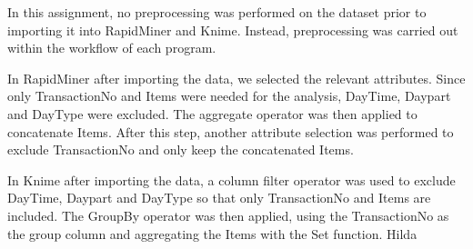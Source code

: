 \label{chap:data-preprocessing}
In this assignment, no preprocessing was performed on the dataset prior to importing it into RapidMiner and Knime. 
Instead, preprocessing was carried out within the workflow of each program. 

In RapidMiner after importing the data, we selected the relevant attributes. 
Since only TransactionNo and Items were needed for the analysis, DayTime, Daypart and DayType were excluded. 
The aggregate operator was then applied to concatenate Items. After this step, another attribute selection was performed to exclude TransactionNo and only keep the concatenated Items. 

In Knime after importing the data, a column filter operator was used to exclude DayTime, Daypart and DayType so that only TransactionNo and Items are included. 
The GroupBy operator was then applied, using the TransactionNo as the group column and aggregating the Items with the Set function. 
Hilda